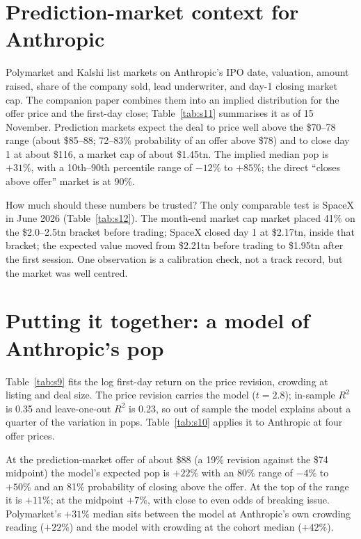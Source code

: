 \documentclass[11pt]{article}
\begin{document}
\section{Prediction-market context for Anthropic}
Polymarket and Kalshi list markets on Anthropic's IPO date, valuation, amount raised, share of the company sold, lead underwriter, and day-1 closing market cap. The companion paper combines them into an implied distribution for the offer price and the first-day close; Table~\ref{tab:s11} summarises it as of 15 November. Prediction markets expect the deal to price well above the \$70--78 range (about \$85--88; 72--83\% probability of an offer above \$78) and to close day 1 at about \$116, a market cap of about \$1.45tn. The implied median pop is $+31\%$, with a 10th--90th percentile range of $-12\%$ to $+85\%$; the direct ``closes above offer'' market is at 90\%.



How much should these numbers be trusted? The only comparable test is SpaceX in June 2026 (Table~\ref{tab:s12}). The month-end market cap market placed 41\% on the \$2.0--2.5tn bracket before trading; SpaceX closed day 1 at \$2.17tn, inside that bracket; the expected value moved from \$2.21tn before trading to \$1.95tn after the first session. One observation is a calibration check, not a track record, but the market was well centred.



\section{Putting it together: a model of Anthropic's pop}
Table~\ref{tab:s9} fits the log first-day return on the price revision, crowding at listing and deal size. The price revision carries the model ($t=2.8$); in-sample $R^2$ is 0.35 and leave-one-out $R^2$ is 0.23, so out of sample the model explains about a quarter of the variation in pops. Table~\ref{tab:s10} applies it to Anthropic at four offer prices.




At the prediction-market offer of about \$88 (a 19\% revision against the \$74 midpoint) the model's expected pop is $+22\%$ with an 80\% range of $-4\%$ to $+50\%$ and an 81\% probability of closing above the offer. At the top of the range it is $+11\%$; at the midpoint $+7\%$, with close to even odds of breaking issue. Polymarket's $+31\%$ median sits between the model at Anthropic's own crowding reading ($+22\%$) and the model with crowding at the cohort median ($+42\%$).
\end{document}

